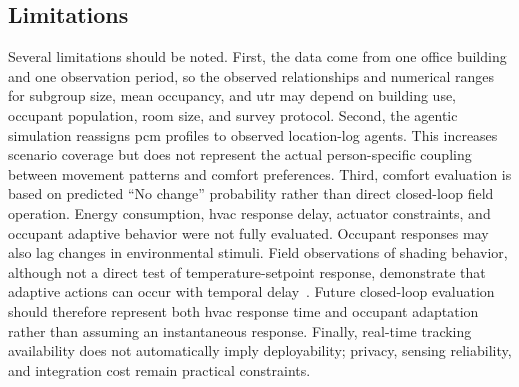 \subsection{Limitations}
Several limitations should be noted.
First, the data come from one office building and one observation period, so the observed relationships and numerical ranges for subgroup size, mean occupancy, and \ac{utr} may depend on building use, occupant population, room size, and survey protocol.
Second, the agentic simulation reassigns \ac{pcm} profiles to observed location-log agents.
This increases scenario coverage but does not represent the actual person-specific coupling between movement patterns and comfort preferences.
Third, comfort evaluation is based on predicted ``No change'' probability rather than direct closed-loop field operation.
Energy consumption, \ac{hvac} response delay, actuator constraints, and occupant adaptive behavior were not fully evaluated.
Occupant responses may also lag changes in environmental stimuli.
Field observations of shading behavior, although not a direct test of temperature-setpoint response, demonstrate that adaptive actions can occur with temporal delay~\cite{li_study_2022}.
Future closed-loop evaluation should therefore represent both \ac{hvac} response time and occupant adaptation rather than assuming an instantaneous response.
Finally, real-time tracking availability does not automatically imply deployability; privacy, sensing reliability, and integration cost remain practical constraints.
